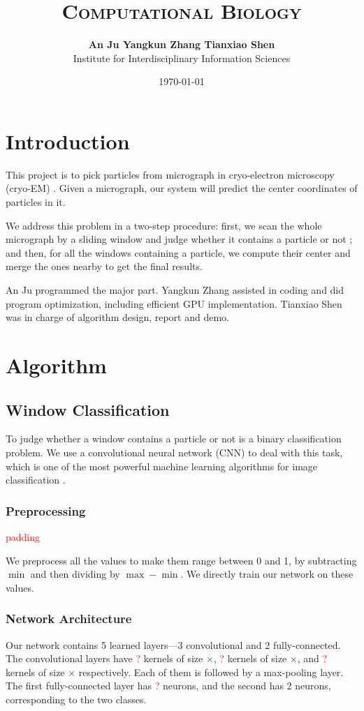 \documentclass[11pt]{article}
\title{\textsc{Computational Biology}\\ \vspace{0.06in}{\bf\Large Project 1: Automated Particle Picking in Cryo-EM}}
\author{\vspace{0.05in}\textbf{An Ju \qquad Yangkun Zhang \qquad Tianxiao Shen}\\Institute for Interdisciplinary Information Sciences}
\date{\monthyeardate\today}
\begin{document}
\maketitle \thispagestyle{empty}


\section{Introduction}
This project is to pick particles from micrograph in cryo-electron microscopy (cryo-EM) \cite{liao2013structure}. Given a micrograph, our system will predict the center coordinates of particles in it.

We address this problem in a two-step procedure: first, we scan the whole micrograph by a sliding window and judge whether it contains a particle or not \cite{langlois2014automated}; and then, for all the windows containing a particle, we compute their center and merge the ones nearby to get the final results.

An Ju programmed the major part. Yangkun Zhang assisted in coding and did program optimization, including efficient GPU implementation. Tianxiao Shen was in charge of algorithm design, report and demo.

\section{Algorithm}
\subsection{Window Classification}
To judge whether a window contains a particle or not is a binary classification problem. We use a convolutional neural network (CNN) to deal with this task, which is one of the most powerful machine learning algorithms for image classification \cite{krizhevsky2012imagenet} .

\subsubsection{Preprocessing}
\textcolor{red}{padding}

We preprocess all the values to make them range between 0 and 1, by subtracting $\min$ and then dividing by $\max-\min$. We directly train our network on these values.

\subsubsection{Network Architecture}
Our network contains 5 learned layers---3 convolutional and 2 fully-connected. The convolutional layers have \textcolor{red}{?} kernels of size $\times$, \textcolor{red}{?} kernels of size $\times$, and \textcolor{red}{?} kernels of size $\times$ respectively. Each of them is followed by a max-pooling layer. The first fully-connected layer has \textcolor{red}{?} neurons, and the second has 2 neurons, corresponding to the two classes.
\end{document}
